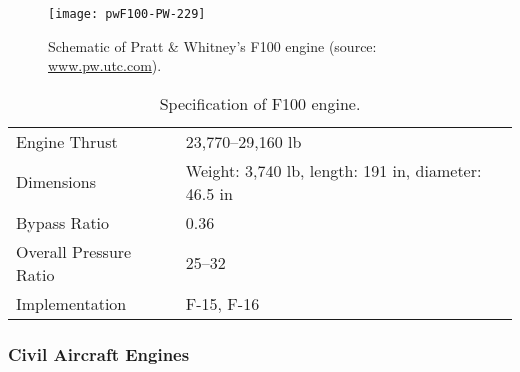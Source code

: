 \begin{figure}[!htb!]
 \centering
    {\texttt{[image: pwF100-PW-229]}}
    \caption{\label{FIG_PW100_SCHEMATIC}Schematic of Pratt \& Whitney's F100 engine (source: \url{www.pw.utc.com}).}
\end{figure}

\begin{table}[!htb!]
  \centering
\begin{tabular}{|p{}|p{}|}\hline
Engine Thrust & 23,770--29,160 lb\\
Dimensions & Weight: 3,740 lb, length: 191 in, diameter: 46.5 in\\
Bypass Ratio& 0.36\\
Overall Pressure Ratio& 25--32\\
Implementation& F-15, F-16\\\hline
\end{tabular}
  \caption{\label{TAB_F100}Specification of F100 engine.}
\end{table}

\subsubsection{Civil Aircraft Engines}

